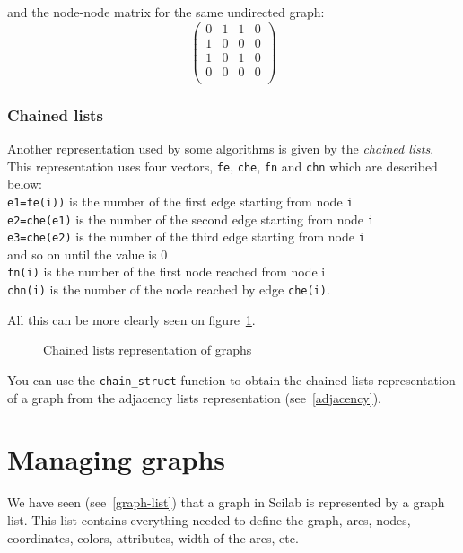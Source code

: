\documentclass[11pt]{article}
\newcommand{\func}[1]{\texttt{#1}}
\begin{document}
and the node-node matrix for the same undirected graph:
\[\left(\begin{array}{cccc}
 0 & 1 & 1 & 0 \\
 1 & 0 & 0 & 0 \\
 1 & 0 & 1 & 0 \\
 0 & 0 & 0 & 0 \\
\end{array}\right)\]

\subsubsection{Chained lists}

Another representation used by some algorithms is given by the
\emph{chained lists}. 
This representation uses four vectors,
\texttt{fe}, \texttt{che}, \texttt{fn} and \texttt{chn} which are
described below:\\
\texttt{e1=fe(i))} is the number of the first edge starting from node 
\texttt{i}\\
\texttt{e2=che(e1)} is the number of the second edge starting from
node \texttt{i}\\
\texttt{e3=che(e2)} is the number of the third edge starting from
node \texttt{i} \\
and so on until the value is 0\\
\texttt{fn(i)} is the number of the first node reached from node i\\
\texttt{chn(i)} is the number of the node reached by edge
\texttt{che(i)}.

All this can be more clearly seen on figure~\ref{fig-chain}.


\begin{figure}
  \begin{center}\end{center}
  \caption{Chained lists representation of graphs}
  \label{fig-chain}
\end{figure}

You can use the \func{chain\_struct} function to obtain the chained
lists representation of a graph from the adjacency lists representation
(see~\ref{adjacency}).

\section{Managing graphs}

We have seen (see~\ref{graph-list}) that a graph in Scilab is
represented by a graph list. This list contains everything needed to
define the graph, arcs, nodes, coordinates, colors, attributes, width of the
arcs, etc.
\end{document}

